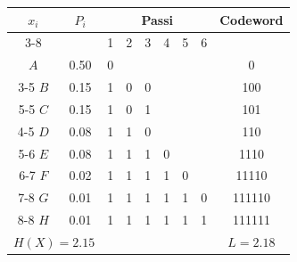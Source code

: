 \begin{table}[htbp]
\centering
\begin{tabular}{|c|c|c|c|c|c|c|c|c|}
\hline
\multirow{2}{*}{$x_i$} & \multirow{2}{*}{$P_i$} & \multicolumn{6}{c|}{Passi} & \multirow{2}{*}{Codeword} \\
\cline{3-8}
& & 1 & 2 & 3 & 4 & 5 & 6 & \\
\hline
$A$ & 0.50 & 0 & & & & & & 0 \\
\cline{3-5}
$B$ & 0.15 & 1 & 0 & 0 & & & & 100 \\
\cline{5-5}
$C$ & 0.15 & 1 & 0 & 1 & & & & 101 \\
\cline{4-5}
$D$ & 0.08 & 1 & 1 & 0 & & & & 110 \\
\cline{5-6}
$E$ & 0.08 & 1 & 1 & 1 & 0 & & & 1110 \\
\cline{6-7}
$F$ & 0.02 & 1 & 1 & 1 & 1 & 0 & & 11110 \\
\cline{7-8}
$G$ & 0.01 & 1 & 1 & 1 & 1 & 1 & 0 & 111110 \\
\cline{8-8}
$H$ & 0.01 & 1 & 1 & 1 & 1 & 1 & 1 & 111111 \\
\hline
\multicolumn{2}{|c|}{$H(X) = 2.15$} & \multicolumn{6}{c|}{} & $L = 2.18$ \\
\hline
\end{tabular}
\end{table}
\FloatBarrier